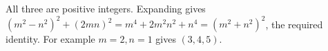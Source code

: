 All three are positive integers. Expanding gives $(m^2-n^2)^2+(2mn)^2=m^4+2m^2n^2+n^4=(m^2+n^2)^2 $, the required identity. For example $ m=2,n=1 $ gives $(3,4,5)$.
